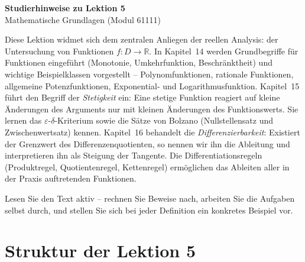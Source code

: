 \documentclass[a4paper,12pt]{article}
\begin{document}
\begin{center}
  {\LARGE\bfseries Studierhinweise zu Lektion 5}\\[0.5em]
  {\large Mathematische Grundlagen (Modul 61111)}
\end{center}

\vspace{1em}

Diese Lektion widmet sich dem zentralen Anliegen der reellen Analysis: der
Untersuchung von Funktionen $f: D \to \mathbb{R}$. In Kapitel~14 werden Grundbegriffe
für Funktionen eingeführt (Monotonie, Umkehrfunktion, Beschränktheit) und
wichtige Beispielklassen vorgestellt -- Polynomfunktionen, rationale Funktionen,
allgemeine Potenzfunktionen, Exponential- und Logarithmusfunktion. Kapitel~15
führt den Begriff der \emph{Stetigkeit} ein: Eine stetige Funktion reagiert auf
kleine Änderungen des Arguments nur mit kleinen Änderungen des Funktionswerts.
Sie lernen das $\varepsilon$-$\delta$-Kriterium sowie die Sätze von Bolzano
(Nullstellensatz und Zwischenwertsatz) kennen. Kapitel~16 behandelt die
\emph{Differenzierbarkeit}: Existiert der Grenzwert des Differenzenquotienten,
so nennen wir ihn die Ableitung und interpretieren ihn als Steigung der Tangente.
Die Differentiationsregeln (Produktregel, Quotientenregel, Kettenregel) ermöglichen
das Ableiten aller in der Praxis auftretenden Funktionen.

Lesen Sie den Text aktiv -- rechnen Sie Beweise nach, arbeiten Sie die
Aufgaben selbst durch, und stellen Sie sich bei jeder Definition ein konkretes
Beispiel vor.

\section*{Struktur der Lektion 5}
\end{document}
